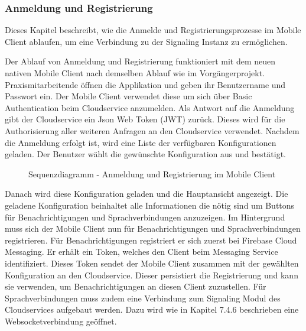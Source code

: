 \subsubsection{Anmeldung und Registrierung}

Dieses Kapitel beschreibt, wie die Anmelde und Registrierungsprozesse im Mobile Client ablaufen, um eine Verbindung zu der Signaling Instanz zu ermöglichen.

Der Ablauf von Anmeldung und Registrierung funktioniert mit dem neuen nativen Mobile Client nach demselben Ablauf wie im Vorgängerprojekt.
Praxismitarbeitende öffnen die Applikation und geben ihr Benutzername und Passwort ein.
Der Mobile Client verwendet diese um sich über Basic Authentication beim Cloudservice anzumelden.
Als Antwort auf die Anmeldung gibt der Cloudservice ein Json Web Token (JWT) zurück.
Dieses wird für die Authorisierung aller weiteren Anfragen an den Cloudservice verwendet.
Nachdem die Anmeldung erfolgt ist, wird eine Liste der verfügbaren Konfigurationen geladen.
Der Benutzer wählt die gewünschte Konfiguration aus und bestätigt.

\begin{figure}[h]
    \centering
    \begin{minipage}[b]{0.9\textwidth}
        \caption{Sequenzdiagramm - Anmeldung und Registrierung im Mobile Client}
    \end{minipage}
\end{figure}

Danach wird diese Konfiguration geladen und die Hauptansicht angezeigt.
Die geladene Konfiguration beinhaltet alle Informationen die nötig sind um Buttons für Benachrichtigungen und Sprachverbindungen anzuzeigen.
Im Hintergrund muss sich der Mobile Client nun für Benachrichtigungen und Sprachverbindungen registrieren.
Für Benachrichtigungen registriert er sich zuerst bei Firebase Cloud Messaging.
Er erhält ein Token, welches den Client beim Messaging Service identifiziert.
Dieses Token sendet der Mobile Client zusammen mit der gewählten Konfiguration an den Cloudservice.
Dieser persistiert die Registrierung und kann sie verwenden, um Benachrichtigungen an diesen Client zuzustellen.
Für Sprachverbindungen muss zudem eine Verbindung zum Signaling Modul des Cloudservices aufgebaut werden.
Dazu wird wie in Kapitel 7.4.6 beschrieben eine Websocketverbindung geöffnet.

